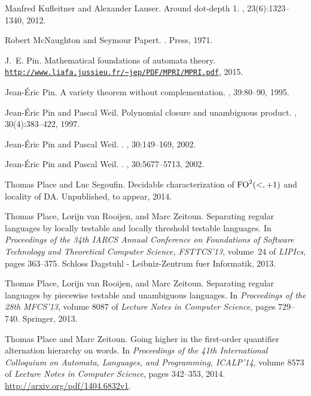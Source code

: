 \documentclass[a4paper,USenglish]{lipics}
\newcommand{\fodp}{\ensuremath{\textup{FO}^2(<,+1)}\xspace}
\theoremstyle{plain}
\begin{document}
\begin{thebibliography}{10}
Manfred Kufleitner and Alexander Lauser.
\newblock Around dot-depth 1.
,
  23(6):1323--1340, 2012.

Robert McNaughton and Seymour Papert.
.
 Press, 1971.

J.~E. Pin.
\newblock Mathematical foundations of automata theory.
\newblock \texttt{\url{http://www.liafa.jussieu.fr/~jep/PDF/MPRI/MPRI.pdf}},
  2015.

Jean-\'Eric Pin.
\newblock A variety theorem without complementation.
, 39:80--90,
  1995.

Jean-\'Eric Pin and Pascal Weil.
\newblock Polynomial closure and unambiguous product.
, 30(4):383--422, 1997.

Jean-\'Eric Pin and Pascal Weil.
.
, 30:149--169, 2002.

Jean-\'Eric Pin and Pascal Weil.
.
, 30:5677--5713, 2002.

Thomas Place and Luc Segoufin.
\newblock Decidable characterization of \fodp and locality of \textsf{{DA}}.
\newblock Unpublished, to appear, 2014.

Thomas Place, Lorijn van Rooijen, and Marc Zeitoun.
\newblock Separating regular languages by locally testable and locally
  threshold testable languages.
\newblock In {\em Proceedings of the 34th IARCS Annual Conference on
  Foundations of Software Technology and Theoretical Computer Science,
  FSTTCS'13}, volume~24 of {\em LIPIcs}, pages 363--375. Schloss Dagstuhl -
  Leibniz-Zentrum fuer Informatik, 2013.

Thomas Place, Lorijn van Rooijen, and Marc Zeitoun.
\newblock Separating regular languages by piecewise testable and unambiguous
  languages.
\newblock In {\em Proceedings of the 28th MFCS'13}, volume 8087 of {\em Lecture
  Notes in Computer Science}, pages 729--740. Springer, 2013.

Thomas Place and Marc Zeitoun.
\newblock Going higher in the first-order quantifier alternation hierarchy on
  words.
\newblock In {\em Proceedings of the 41th International Colloquium on Automata,
  Languages, and Programming, ICALP'14}, volume 8573 of {\em Lecture Notes in
  Computer Science}, pages 342--353, 2014.
\newblock \url{http://arxiv.org/pdf/1404.6832v1}.


\end{thebibliography}
\end{document}
